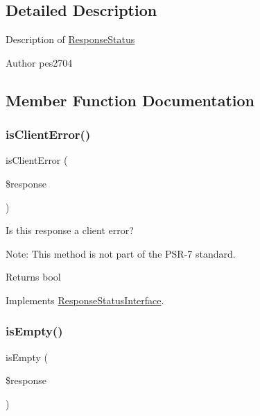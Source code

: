\subsection{Detailed Description}
Description of \mbox{\hyperlink{class_pes_1_1_http_1_1_response_status}{Response\+Status}}

\begin{DoxyAuthor}{Author}
pes2704 
\end{DoxyAuthor}


\subsection{Member Function Documentation}
\mbox{\label{class_pes_1_1_http_1_1_response_status_a3f4db87c51272174be28176a2919633d}} 
\subsubsection{\texorpdfstring{is\+Client\+Error()}{isClientError()}}
{\footnotesize\ttfamily is\+Client\+Error (\begin{DoxyParamCaption}\item[{Response\+Interface}]{\$response }\end{DoxyParamCaption})}

Is this response a client error?

Note\+: This method is not part of the P\+S\+R-\/7 standard.

\begin{DoxyReturn}{Returns}
bool 
\end{DoxyReturn}


Implements \mbox{\hyperlink{interface_pes_1_1_http_1_1_response_status_interface_a3f4db87c51272174be28176a2919633d}{Response\+Status\+Interface}}.

\mbox{\label{class_pes_1_1_http_1_1_response_status_a5166ac30ac60791ad8c30d76038b9371}} 
\subsubsection{\texorpdfstring{is\+Empty()}{isEmpty()}}
{\footnotesize\ttfamily is\+Empty (\begin{DoxyParamCaption}\item[{Response\+Interface}]{\$response }\end{DoxyParamCaption})}


